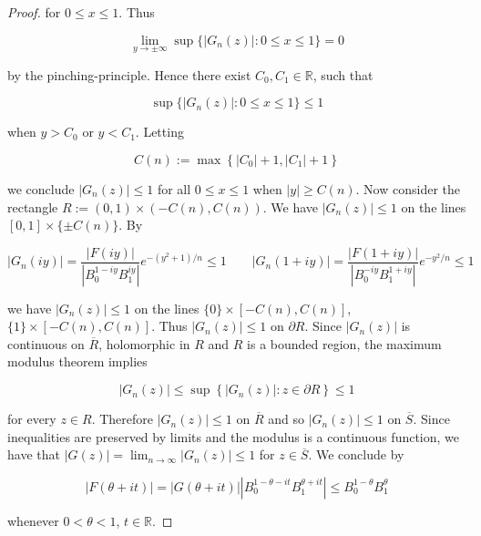 \begin{proof}
for $0 \leqslant x \leqslant 1$. Thus
	
\begin{equation*}
	\lim_{y \to \pm \infty}\sup\{\left| G_n(z)\right| : 0 \leqslant x \leqslant 1\} = 0
\end{equation*}

by the pinching-principle. Hence there exist $C_0,C_1 \in \mathbb{R}$, such that 

\begin{equation*}
	\sup\{\left| G_n(z)\right| : 0 \leqslant x \leqslant 1\} \leqslant 1
\end{equation*}

when $y > C_0$ or $y < C_1$. Letting

\begin{equation*}
	C(n) := \max\left\{ \left| C_0\right| + 1, \left| C_1 \right| + 1\right\}
\end{equation*}

we conclude $\left| G_n(z) \right| \leqslant 1$ for all $0 \leqslant x \leqslant 1$ when $\left| y \right| \geqslant C(n)$. Now consider the rectangle $R := \left(0,1\right) \times \left(-C(n),C(n)\right)$. We have $\left| G_n(z) \right| \leqslant 1$ on the lines $[0,1] \times \{\pm C(n)\}$. By

\begin{equation*}
	\left| G_n(iy)\right| = \frac{\left| F(iy)\right|}{\left| B_0^{1 - iy} B_1^{iy}\right|}e^{-\left( y^2 + 1 \right)/n} \leqslant 1 \qquad \left| G_n(1 + iy)\right| =	\frac{\left| F(1 + iy)\right|}{\left| B_0^{-iy}B_1^{1 + iy}\right|}e^{-y^2/n} \leqslant 1
\end{equation*}

we have $\left| G_n(z)\right| \leqslant 1$ on the lines $\{0\} \times [-C(n),C(n)]$, $\{1\} \times [-C(n),C(n)]$. Thus $\left| G_n(z) \right| \leqslant 1$ on $\partial R$. Since $\left| G_n(z)\right|$ is continuous on $\overline{R}$, holomorphic in $R$ and $R$ is a bounded region, the maximum modulus theorem implies

\begin{equation*}
	\left| G_n(z)\right| \leqslant \sup\left\{ \left|G_n(z) \right| : z \in \partial R \right\} \leqslant 1
\end{equation*}

for every $z \in R$. Therefore $\left| G_n(z) \right| \leqslant 1$ on $\overline{R}$ and so $\left| G_n(z) \right| \leqslant 1$ on $\overline{S}$. Since inequalities are preserved by limits and the modulus is a continuous function, we have that $\left| G(z) \right| = \lim_{n \to \infty} \left| G_n(z) \right| \leqslant 1$ for $z \in \overline{S}$. We conclude by 

\begin{equation*}
	\left| F(\theta + it) \right| = \left| G(\theta + it) \right| \left| B_0^{1 - \theta - it}B_1^{\theta + it}\right| \leqslant B_0^{1 - \theta} B_1^{\theta}
\end{equation*}

whenever $0 < \theta < 1$, $t \in \mathbb{R}$.
\end{proof}

